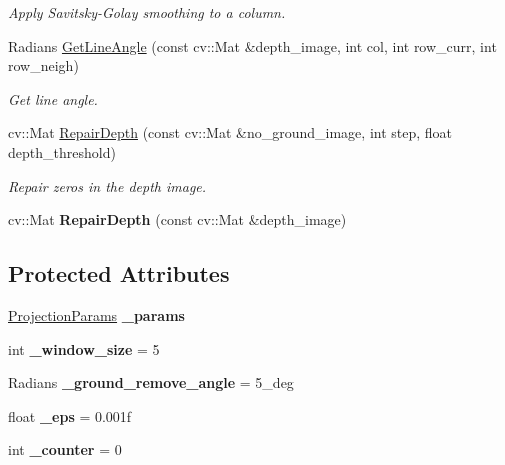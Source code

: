 \begin{DoxyCompactItemize}
\begin{DoxyCompactList}\small\item\em Apply Savitsky-\/\+Golay smoothing to a column. \end{DoxyCompactList}\item 
Radians \hyperlink{classdepth__clustering_1_1DepthGroundRemover_a29ba07a101794aab322ae3c0671806e0}{Get\+Line\+Angle} (const cv\+::\+Mat \&depth\+\_\+image, int col, int row\+\_\+curr, int row\+\_\+neigh)
\begin{DoxyCompactList}\small\item\em Get line angle. \end{DoxyCompactList}\item 
cv\+::\+Mat \hyperlink{classdepth__clustering_1_1DepthGroundRemover_a51dd313ed1bdda2188fb3a3fa1c5738e}{Repair\+Depth} (const cv\+::\+Mat \&no\+\_\+ground\+\_\+image, int step, float depth\+\_\+threshold)
\begin{DoxyCompactList}\small\item\em Repair zeros in the depth image. \end{DoxyCompactList}\item 
\mbox{\label{classdepth__clustering_1_1DepthGroundRemover_ab44815e8ea8b10abce24faebf8322624}} 
cv\+::\+Mat {\bfseries Repair\+Depth} (const cv\+::\+Mat \&depth\+\_\+image)
\end{DoxyCompactItemize}
\subsection*{Protected Attributes}
\begin{DoxyCompactItemize}
\item 
\mbox{\label{classdepth__clustering_1_1DepthGroundRemover_ad4ff83331f7ad6a3bbb22ce5356471ed}} 
\hyperlink{classdepth__clustering_1_1ProjectionParams}{Projection\+Params} {\bfseries \+\_\+params}
\item 
\mbox{\label{classdepth__clustering_1_1DepthGroundRemover_a44a1a7778c4913540c9fd3545671ee96}} 
int {\bfseries \+\_\+window\+\_\+size} = 5
\item 
\mbox{\label{classdepth__clustering_1_1DepthGroundRemover_a6acd966842064c50552cfd3857652cd8}} 
Radians {\bfseries \+\_\+ground\+\_\+remove\+\_\+angle} = 5\+\_\+deg
\item 
\mbox{\label{classdepth__clustering_1_1DepthGroundRemover_a1d27a305647b5315b1c2a46c4b0a3039}} 
float {\bfseries \+\_\+eps} = 0.\+001f
\item 
\mbox{\label{classdepth__clustering_1_1DepthGroundRemover_a5230ebdee643d0e76c86486adf70db5d}} 
int {\bfseries \+\_\+counter} = 0
\end{DoxyCompactItemize}
